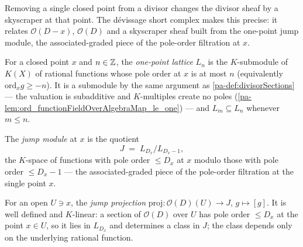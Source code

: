 Removing a single closed point from a divisor changes the divisor sheaf by a skyscraper at that
point. The dévissage short complex makes this precise: it relates \(\mathcal O(D-x)\), \(\mathcal
O(D)\) and a skyscraper sheaf built from the one-point jump module, the associated-graded piece of
the pole-order filtration at \(x\).

\begin{definition}
  \label{pa-def:pointLattice}
  \leanok

  For a closed point \(x\) and \(n \in \mathbb{Z}\), the \emph{one-point lattice} \(L_n\) is the
  \(K\)-submodule of \(K(X)\) of rational functions whose pole order at \(x\) is at most \(n\)
  (equivalently \(\mathrm{ord}_x g \ge -n\)). It is a submodule by the same argument as
  \ref{pa-def:divisorSections} --- the valuation is subadditive and \(K\)-multiples create no poles
  (\ref{pa-lem:ord_functionFieldOverAlgebraMap_le_one}) --- and \(L_m \subseteq L_n\) whenever
  \(m \le n\).
\end{definition}

\begin{definition}
  \label{pa-def:jumpModule}
  \leanok

  The \emph{jump module} at \(x\) is the quotient
  \[
    J \;=\; L_{D_x} \big/ L_{D_x - 1},
  \]
  the \(K\)-space of functions with pole order \(\le D_x\) at \(x\) modulo those with pole order
  \(\le D_x - 1\) --- the associated-graded piece of the pole-order filtration at the single point
  \(x\).
\end{definition}

\begin{definition}
  \label{pa-def:jumpProj}
  \leanok

  For an open \(U \ni x\), the \emph{jump projection} \(\mathrm{proj} : \mathcal O(D)(U) \to J\),
  \(g \mapsto [g]\). It is well defined and \(K\)-linear: a section of \(\mathcal O(D)\) over \(U\)
  has pole order \(\le D_x\) at the point \(x \in U\), so it lies in \(L_{D_x}\) and determines a
  class in \(J\); the class depends only on the underlying rational function.
\end{definition}

